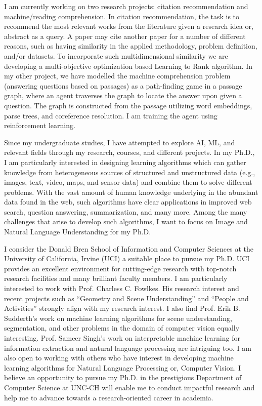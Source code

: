 \documentclass[12pt]{article}
\begin{document}
I am currently working on two research projects: citation recommendation and machine/reading comprehension. In citation recommendation, the task is to recommend the most relevant works from the literature given a research idea or, abstract as a query. A paper may cite another paper for a number of different reasons, such as having similarity in the applied methodology, problem definition, and/or datasets. To incorporate such multidimensional similarity we are developing a multi-objective optimization based Learning to Rank algorithm. In my other project, we have modelled the machine comprehension problem (answering questions based on passages) as a path-finding game in a passage graph, where an agent traverses the graph to locate the answer upon given a question. The graph is constructed from the passage utilizing word embeddings, parse trees, and coreference resolution. I am training the agent using reinforcement learning.

Since my undergraduate studies, I have attempted to explore AI, ML, and relevant fields through my research, courses, and different projects. In my Ph.D., I am particularly interested in designing learning algorithms which can gather knowledge from heterogeneous sources of structured and unstructured data (e.g., images, text, video, maps, and sensor data) and combine them to solve different problems. With the vast amount of human knowledge underlying in the abundant data found in the web, such algorithms have clear applications in improved web search, question answering, summarization, and many more. Among the many challenges that arise to develop such algorithms, I want to focus on Image and Natural Language Understanding for my Ph.D.

I consider the Donald Bren School of Information and Computer Sciences at the University of California, Irvine (UCI) a suitable place to pursue my Ph.D. UCI provides an excellent environment for cutting-edge research with top-notch research facilities and many brilliant faculty members. I am particularly interested to work with Prof. Charless C. Fowlkes. His research interest and recent projects such as ``Geometry and Scene Understanding'' and ``People and Activities'' strongly align with my research interest. I also find Prof. Erik B. Sudderth's work on machine learning algorithms for scene understanding, segmentation, and other problems in the domain of computer vision equally interesting. Prof. Sameer Singh’s work on interpretable machine learning for information extraction and natural language processing are intriguing too. I am also open to working with others who have interest in developing machine learning algorithms for Natural Language Processing or, Computer Vision. I believe an opportunity to pursue my Ph.D. in the prestigious Department of Computer Science at UNC-CH will enable me to conduct impactful research and help me to advance towards a research-oriented career in academia. 
\end{document}

